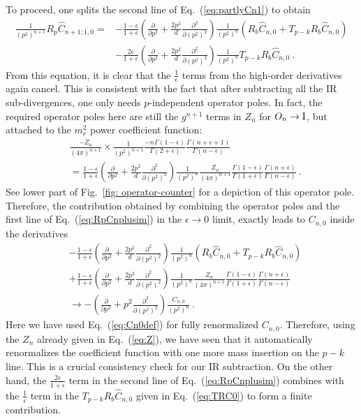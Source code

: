 \documentclass[a4paper,11pt]{article}
\begin{document}
To proceed, one splits the second line of Eq.~(\ref{eq:partlyCn1}) to obtain
\begin{align}
\frac{1}{(p^2)^{n+1}}R_{p}\hat C_{n+1;1,0}=&-\frac{1-\epsilon}{1+\epsilon}\left(\frac{\partial}{\partial p^2}+\frac{2p^2}{d}\frac{\partial^2}{\partial(p^2)^2}\right)\frac{1}{(p^2)^n}\left(R_b\hat C_{n,0}+T_{p-k}R_b\hat C_{n,0}\right)\nonumber \\ 
&-\frac{2\epsilon}{1+\epsilon} \left(\frac{\partial}{\partial p^2}+\frac{2p^2}{d}\frac{\partial^2}{\partial(p^2)^2}\right)\frac{1}{(p^2)^n}T_{p-k}R_b \hat C_{n,0}
\ . \label{eq:RpCnplusim}
\end{align}
From this equation, it is clear that the $\frac{1}{\epsilon}$ terms from the high-order derivatives again cancel. This is consistent with the fact that after subtracting all the IR sub-divergences, one only needs $p$-independent operator poles. In fact, the required operator poles here are still the $g^{n+1}$ terms in $Z_n$ for $O_n\rightarrow{\rm I}$, but attached to the $m_r^2$ power coefficient function:
\begin{align}
&\frac{-Z_n}{(4\pi)^{n+1}}\times \frac{1}{(p^2)^{n+1}}\frac{-n\Gamma(1-\epsilon)}{\Gamma(2+\epsilon)}\frac{\Gamma(n+\epsilon+1)}{\Gamma(n-\epsilon)}\nonumber \\ 
&=\frac{1-\epsilon}{1+\epsilon}\left(\frac{\partial}{\partial p^2}+\frac{2p^2}{d}\frac{\partial^2}{\partial(p^2)^2}\right)\frac{1}{(p^2)^n}\frac{Z_n}{(4\pi)^{n+1}}\frac{\Gamma(1-\epsilon)}{\Gamma(1+\epsilon)}\frac{\Gamma(n+\epsilon)}{\Gamma(n-\epsilon)} \ .
\end{align}
See lower part of Fig.~\ref{fig: operator-counter} for a depiction of this operator pole. 
Therefore, the contribution obtained by combining the operator poles and the first line of Eq.~(\ref{eq:RpCnplusim}) in the $\epsilon \rightarrow 0$ limit, exactly leads to $C_{n,0}$ inside the derivatives
\begin{align}
&-\frac{1-\epsilon}{1+\epsilon}\left(\frac{\partial}{\partial p^2}+\frac{2p^2}{d}\frac{\partial^2}{\partial(p^2)^2}\right)\frac{1}{(p^2)^n}\left(R_b\hat C_{n,0}+T_{p-k}R_b \hat C_{n,0}\right) \nonumber \\ 
&+\frac{1-\epsilon}{1+\epsilon}\left(\frac{\partial}{\partial p^2}+\frac{2p^2}{d}\frac{\partial^2}{\partial(p^2)^2}\right)\frac{1}{(p^2)^n}\frac{Z_n}{(4\pi)^{n+1}}\frac{\Gamma(1-\epsilon)}{\Gamma(1+\epsilon)}\frac{\Gamma(n+\epsilon)}{\Gamma(n-\epsilon)} \nonumber \\ 
&\rightarrow-\left(\frac{\partial}{\partial p^2}+p^2\frac{\partial^2}{\partial(p^2)^2}\right)\frac{C_{n,0}}{(p^2)^n}  \ .
\end{align}
Here we have used Eq.~(\ref{eq:Cn0def}) for fully renormalized $C_{n,0}$. Therefore, using the $Z_n$ already given in Eq.~(\ref{eq:Z}), we have seen that it automatically renormalizes the coefficient function with one more mass insertion on the $p-k$ line. This is a crucial consistency check for our IR subtraction. On the other hand, the $\frac{2\epsilon}{1+\epsilon}$ term in the second line of Eq.~(\ref{eq:RpCnplusim}) combines with the $\frac{1}{\epsilon}$ term in the $T_{p-k}R_b \hat C_{n,0}$ given in Eq.~(\ref{eq:TRC0}) to form a finite contribution. 
\end{document}
